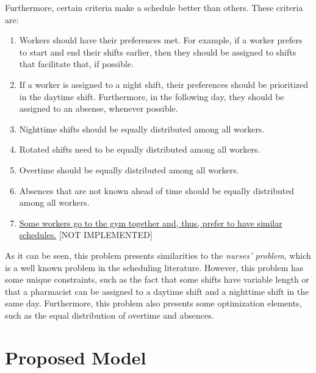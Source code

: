 \documentclass[conference]{IEEEtran}
\def\NOIMPL#1{\ul{#1} {\color{blue}[NOT IMPLEMENTED]\color{black}}}
\begin{document}
Furthermore, certain criteria make a schedule better than others. These criteria are:

\begin{enumerate}[resume]
    \item {
        \label{criterion:worker-preferences}
        Workers should have their preferences met. For example, if a worker prefers to start and end their shifts earlier, then they should be assigned to shifts that facilitate that, if possible.
    }
    \item {
        \label{criterion:nighttime-workers-prioritzation}
        If a worker is assigned to a night shift, their preferences should be prioritized in the daytime shift. Furthermore, in the following day, they should be assigned to an absense, whenever possible.
    }
    \item {
        \label{criterion:night-shifts-distribution}
        Nighttime shifts should be equally distributed among all workers.
    }
    \item {
        \label{criterion:rotated-shifts-distribution}
        Rotated shifts need to be equally distributed among all workers.
    }
    \item {
        \label{criterion:overtime-distribution}
        Overtime should be equally distributed among all workers.
    }
    \item {
        \label{criterion:absences-distribution}
        Absences that are not known ahead of time should be equally distributed among all workers.
    }
    \item {
        \label{criterion:worker-groups}
        \NOIMPL{Some workers go to the gym together and, thus, prefer to have similar schedules.}
    }
\end{enumerate}

As it can be seen, this problem presents similarities to the \textit{nurses' problem}, which is a well known problem in the scheduling literature. However, this problem has some unique constraints, such as the fact that some shifts have variable length or that a pharmacist can be assigned to a daytime shift and a nighttime shift in the same day. Furthermore, this problem also presents some optimization elements, such as the equal distribution of overtime and absences.

\section{Proposed Model}
\label{section:proposed-model}
\end{document}
